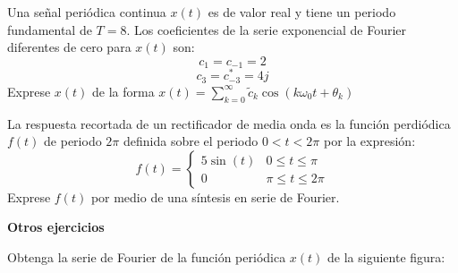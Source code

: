 \begin{ejercicio}
    Una señal periódica continua $x(t)$ es de valor real y tiene un periodo fundamental de $T=8$. Los coeficientes de la serie exponencial de Fourier diferentes de cero para $x(t)$ son:
    $$ c_1 = c_{-1} = 2 $$
    $$ c_3 = c^*_{-3} = 4j $$
    Exprese $x(t)$ de la forma $x(t)=\sum_{k=0}^{\infty} \tilde{c}_k \cos(k\omega_0 t + \theta_k)$
\end{ejercicio}

\begin{ejercicio}
    La respuesta recortada de un rectificador de media onda es la función perdiódica $f(t)$ de periodo $2\pi$ definida sobre el periodo $0<t<2\pi$ por la expresión:
    $$
    f(t) = \left\{
        \begin{array}{ll}
            5\sin(t)   & 0 \leq t \leq \pi\\
            0          & \pi \leq t \leq 2\pi
         \end{array}
        \right.
    $$
    Exprese $f(t)$ por medio de una síntesis en serie de Fourier.
\end{ejercicio}

\clearpage
{\Large \bf \centering Otros ejercicios}

\begin{ejercicio}
    Obtenga la serie de Fourier de la función periódica $x(t)$ de la siguiente figura:
    \begin{figure}[!h]
		\centering
		
	\end{figure}
\end{ejercicio}

